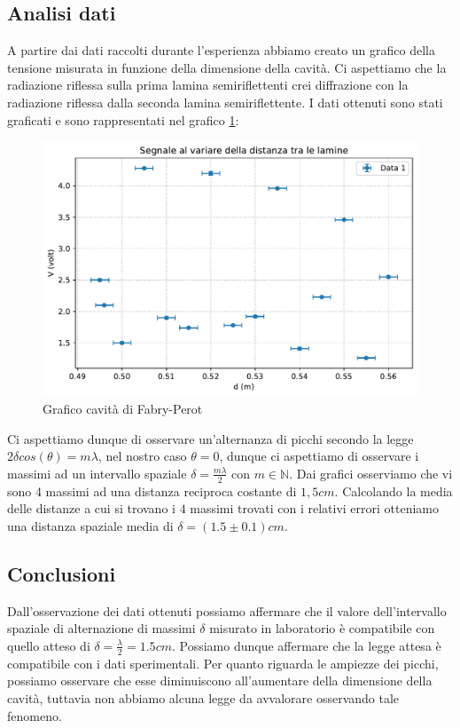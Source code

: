 \documentclass[a4paper]{article}
\begin{document}
\subsection{Analisi dati}
A partire dai dati raccolti durante l'esperienza abbiamo creato un grafico della tensione misurata in funzione della dimensione della cavità. Ci aspettiamo che la radiazione riflessa sulla prima lamina semiriflettenti crei diffrazione con la radiazione riflessa dalla seconda lamina semiriflettente. I dati ottenuti sono stati graficati e sono rappresentati nel grafico \ref{fig:grafico Fabry-Perot}:
\begin{figure}[H]
    \centering
    \includegraphics[width=0.5\linewidth]{grafici/fabriperot.pdf}
    \caption{Grafico cavità di Fabry-Perot}
    \label{fig:grafico Fabry-Perot}
\end{figure}




Ci aspettiamo dunque di osservare un'alternanza di picchi secondo la legge $2\delta cos(\theta)=m\lambda$, nel nostro caso $\theta=0$, dunque ci aspettiamo di osservare i massimi ad un intervallo spaziale $\delta=\frac{m\lambda}{2}$ con $m\in\mathbb{N}$. Dai grafici osserviamo che vi sono 4 massimi ad una distanza reciproca costante di $1,5cm$. Calcolando la media delle distanze a cui si trovano i $4$ massimi trovati con i relativi errori otteniamo una distanza spaziale media di $\delta=(1.5\pm 0.1)cm$.  


\subsection{Conclusioni}
Dall'osservazione dei dati ottenuti possiamo affermare che il valore dell'intervallo spaziale di alternazione di massimi $\delta$ misurato in laboratorio è compatibile con quello atteso di $\delta=\frac{\lambda}{2}=1.5cm$. Possiamo dunque affermare che la legge attesa è compatibile con i dati sperimentali. Per quanto riguarda le ampiezze dei picchi, possiamo osservare che esse diminuiscono all'aumentare della dimensione della cavità, tuttavia non abbiamo alcuna legge da avvalorare osservando tale fenomeno.
\end{document}
